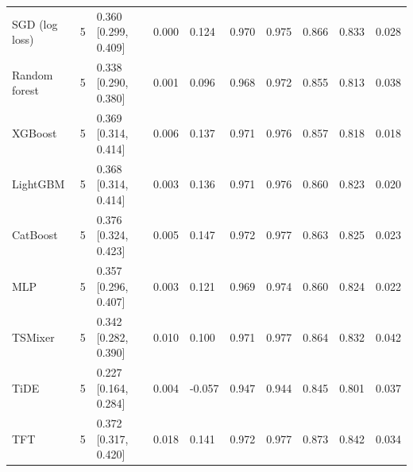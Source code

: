 \begin{longtable}{lrllllllll}
SGD (log loss) & 5 & 0.360 [0.299, 0.409] & 0.000 & 0.124 & 0.970 & 0.975 & 0.866 & 0.833 & 0.028 \\
Random forest & 5 & 0.338 [0.290, 0.380] & 0.001 & 0.096 & 0.968 & 0.972 & 0.855 & 0.813 & 0.038 \\
XGBoost & 5 & 0.369 [0.314, 0.414] & 0.006 & 0.137 & 0.971 & 0.976 & 0.857 & 0.818 & 0.018 \\
LightGBM & 5 & 0.368 [0.314, 0.414] & 0.003 & 0.136 & 0.971 & 0.976 & 0.860 & 0.823 & 0.020 \\
CatBoost & 5 & 0.376 [0.324, 0.423] & 0.005 & 0.147 & 0.972 & 0.977 & 0.863 & 0.825 & 0.023 \\
MLP & 5 & 0.357 [0.296, 0.407] & 0.003 & 0.121 & 0.969 & 0.974 & 0.860 & 0.824 & 0.022 \\
TSMixer & 5 & 0.342 [0.282, 0.390] & 0.010 & 0.100 & 0.971 & 0.977 & 0.864 & 0.832 & 0.042 \\
TiDE & 5 & 0.227 [0.164, 0.284] & 0.004 & -0.057 & 0.947 & 0.944 & 0.845 & 0.801 & 0.037 \\
TFT & 5 & 0.372 [0.317, 0.420] & 0.018 & 0.141 & 0.972 & 0.977 & 0.873 & 0.842 & 0.034 \\
\end{longtable}
